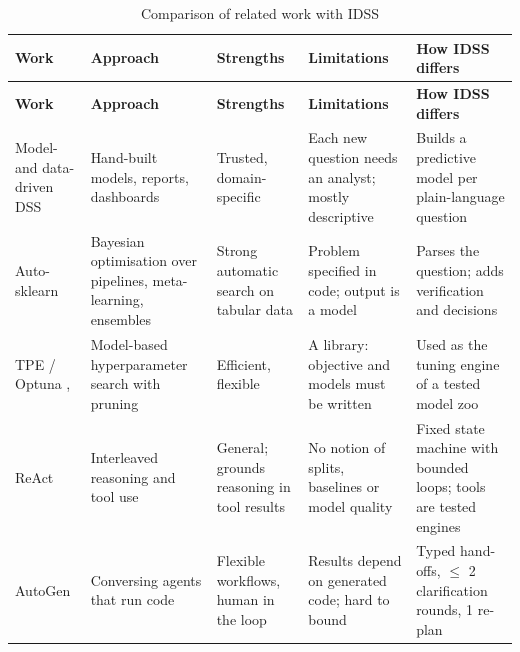 \begingroup
\linespread{1}\small
\setlength{\tabcolsep}{4pt}
\begin{longtable}{|>{\raggedright\arraybackslash\hspace{0pt}}p{}|>{\raggedright\arraybackslash\hspace{0pt}}p{}|>{\raggedright\arraybackslash\hspace{0pt}}p{}|>{\raggedright\arraybackslash\hspace{0pt}}p{}|>{\raggedright\arraybackslash\hspace{0pt}}p{}|}
\caption{Comparison of related work with IDSS}\label{tab:2.4}\\
\hline
\rowcolor{tableheader}\textbf{Work} & \textbf{Approach} & \textbf{Strengths} & \textbf{Limitations} & \textbf{How IDSS differs} \\
\hline
\endfirsthead
\hline
\rowcolor{tableheader}\textbf{Work} & \textbf{Approach} & \textbf{Strengths} & \textbf{Limitations} & \textbf{How IDSS differs} \\
\endhead
Model- and data-driven DSS \cite{ref1} & Hand-built models, reports, dashboards & Trusted, domain-specific & Each new question needs an analyst; mostly descriptive & Builds a predictive model per plain-language question \\ \hline
Auto-sklearn \cite{ref5} & Bayesian optimisation over pipelines, meta-learning, ensembles & Strong automatic search on tabular data & Problem specified in code; output is a model & Parses the question; adds verification and decisions \\ \hline
TPE / Optuna \cite{ref6}, \cite{ref7} & Model-based hyperparameter search with pruning & Efficient, flexible & A library: objective and models must be written & Used as the tuning engine of a tested model zoo \\ \hline
ReAct \cite{ref8} & Interleaved reasoning and tool use & General; grounds reasoning in tool results & No notion of splits, baselines or model quality & Fixed state machine with bounded loops; tools are tested engines \\ \hline
AutoGen \cite{ref12} & Conversing agents that run code & Flexible workflows, human in the loop & Results depend on generated code; hard to bound & Typed hand-offs, \ensuremath{\leq} 2 clarification rounds, 1 re-plan \\ \hline

\end{longtable}
